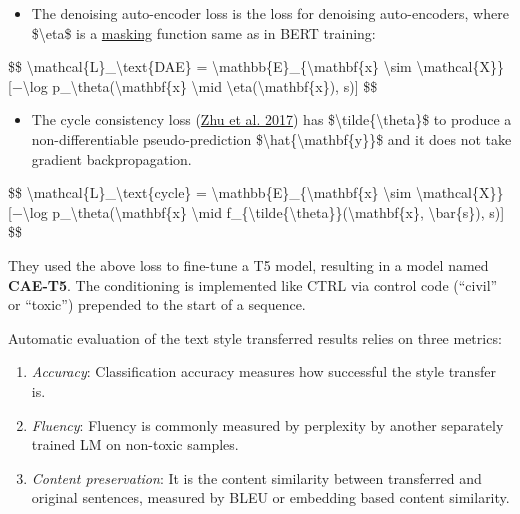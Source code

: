 \begin{itemize}
\tightlist
\item
  The denoising auto-encoder loss is the loss for denoising auto-encoders, where \$\textbackslash eta\$ is a \href{https://lilianweng.github.io/posts/2019-01-31-lm/\#pre-training-tasks}{masking} function same as in BERT training:
\end{itemize}

\$\$ \textbackslash mathcal\{L\}\_\textbackslash text\{DAE\} = \textbackslash mathbb\{E\}\_\{\textbackslash mathbf\{x\} \textbackslash sim \textbackslash mathcal\{X\}\} {[}−\textbackslash log p\_\textbackslash theta(\textbackslash mathbf\{x\} \textbackslash mid \textbackslash eta(\textbackslash mathbf\{x\}), s){]} \$\$

\begin{itemize}
\tightlist
\item
  The cycle consistency loss (\href{https://arxiv.org/abs/1703.10593}{Zhu et al. 2017}) has \$\textbackslash tilde\{\textbackslash theta\}\$ to produce a non-differentiable pseudo-prediction \$\textbackslash hat\{\textbackslash mathbf\{y\}\}\$ and it does not take gradient backpropagation.
\end{itemize}

\$\$ \textbackslash mathcal\{L\}\_\textbackslash text\{cycle\} = \textbackslash mathbb\{E\}\_\{\textbackslash mathbf\{x\} \textbackslash sim \textbackslash mathcal\{X\}\} {[}−\textbackslash log p\_\textbackslash theta(\textbackslash mathbf\{x\} \textbackslash mid f\_\{\textbackslash tilde\{\textbackslash theta\}\}(\textbackslash mathbf\{x\}, \textbackslash bar\{s\}), s){]} \$\$

They used the above loss to fine-tune a T5 model, resulting in a model named \textbf{CAE-T5}. The conditioning is implemented like CTRL via control code (``civil'' or ``toxic'') prepended to the start of a sequence.

Automatic evaluation of the text style transferred results relies on three metrics:

\begin{enumerate}
\tightlist
\item
  \emph{Accuracy}: Classification accuracy measures how successful the style transfer is.
\item
  \emph{Fluency}: Fluency is commonly measured by perplexity by another separately trained LM on non-toxic samples.
\item
  \emph{Content preservation}: It is the content similarity between transferred and original sentences, measured by BLEU or embedding based content similarity.
\end{enumerate}

